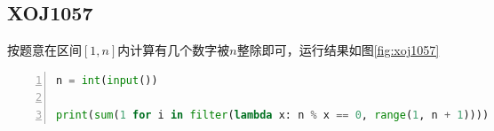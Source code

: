 \documentclass[a4paper,twoside]{article}
\begin{document}
\begin{spacing}{1.2}
\section{XOJ1057}

按题意在区间$[1,n]$内计算有几个数字被$n$整除即可，运行结果如图\ref{fig:xoj1057}

\begin{lstlisting}[language=Python,numbers=left,style=PythonStyle,caption=XOJ1057,label={code:multipier}]
n = int(input())

print(sum(1 for i in filter(lambda x: n % x == 0, range(1, n + 1))))
\end{lstlisting}

\end{spacing}
\end{document}
